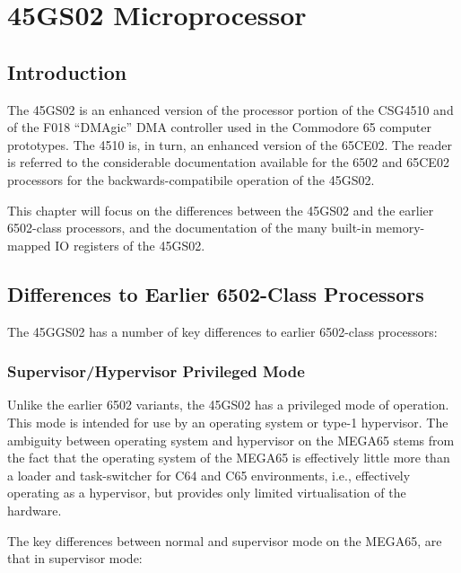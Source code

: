 \chapter{45GS02 Microprocessor}

\section{Introduction}

The 45GS02 is an enhanced version of the processor portion of the CSG4510
and of the F018 ``DMAgic'' DMA controller used in the Commodore 65 computer prototypes.  The 4510 is, in turn,
an enhanced version of the 65CE02.  
The reader is referred to
the considerable documentation available for the 6502 and 65CE02 processors
for the backwards-compatibile operation of the 45GS02.

This chapter will
focus on the differences between the 45GS02 and the earlier 6502-class
processors, and the documentation of the many built-in memory-mapped IO
registers of the 45GS02.

\section{Differences to Earlier 6502-Class Processors}

The 45GGS02 has a number of key differences to earlier 6502-class processors:

\subsection{Supervisor/Hypervisor Privileged Mode}

Unlike the earlier 6502 variants, the 45GS02 has a privileged mode of operation.
This mode is intended for use by an operating system or type-1 hypervisor.  The ambiguity between
operating system and hypervisor on the MEGA65 stems from the fact that the operating
system of the MEGA65 is effectively little more than a loader and task-switcher for C64 and C65
environments, i.e., effectively operating as a hypervisor, but provides only limited virtualisation
of the hardware.

The key differences between normal and supervisor mode on the MEGA65, are that in
supervisor mode:

